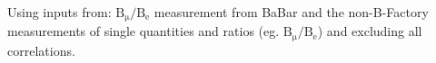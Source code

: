 \noindent Using inputs from: $\mathrm{B_\mu/B_e}$ measurement from BaBar and the non-B-Factory measurements of single quantities and ratios (eg. $\mathrm{B_\mu/B_e}$) and excluding all correlations.
